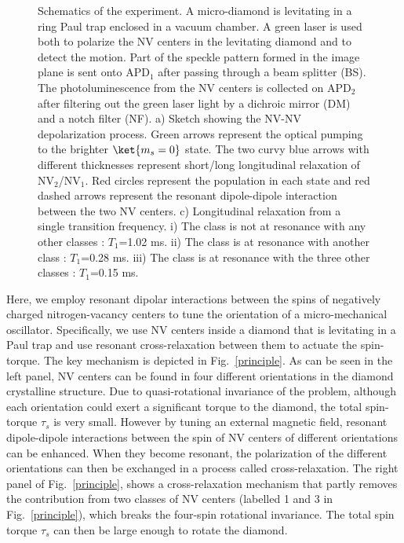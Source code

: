 \documentclass[preprintnumbers,amsmath,amssymb,superscriptaddress,twocolumn,showpacs]{revtex4-1}
\begin{document}
\begin{figure}[!ht]
  \centering {}
  \caption{Schematics of the experiment. A micro-diamond is levitating in a ring Paul trap enclosed in a vacuum chamber. A green laser is used both to polarize the NV centers in the levitating diamond and to detect the motion. Part of the speckle pattern formed in the image plane is sent onto APD$_1$ after passing through a beam splitter (BS). The photoluminescence from the NV centers is collected on APD$_2$ after filtering out the green laser light by a dichroic mirror (DM) and a notch filter (NF). a) Sketch showing the NV-NV depolarization process. Green arrows represent the optical pumping to the brighter $\ket{m_s=0}$ state. The two curvy blue arrows with different thicknesses represent short/long longitudinal relaxation of NV$_2$/NV$_1$. Red circles represent the population in each state and red dashed arrows represent the resonant dipole-dipole interaction between the two NV centers. c) Longitudinal relaxation from a single transition frequency. i) The class is not at resonance with any other classes : $T_1$=1.02 ms. ii) The class is at resonance with another class : $T_1$=0.28 ms. iii) The class is at resonance with the three other classes : $T_1$=0.15 ms.
  }\label{setup}
\end{figure}

Here, we employ resonant dipolar interactions between the spins of negatively charged nitrogen-vacancy centers to tune the orientation of a micro-mechanical oscillator. 
Specifically, we use NV centers inside a diamond that is levitating in a Paul trap and use resonant cross-relaxation between them to actuate
the spin-torque.
The key mechanism is depicted in Fig.~\ref{principle}. 
As can be seen in the left panel, NV centers can be found in four different orientations in the diamond crystalline structure. Due to quasi-rotational invariance of the problem, although each orientation could exert a significant torque to the diamond, the total spin-torque $\tau_s$ is very small.
However by tuning an external magnetic field, resonant dipole-dipole interactions between the spin of NV centers of different orientations can be enhanced. 
When they become resonant, the polarization of the different orientations can then be exchanged in a process called cross-relaxation.
The right panel of Fig.~\ref{principle}, shows a cross-relaxation mechanism that partly removes the contribution from two classes of NV centers (labelled 1 and 3 in Fig.~\ref{principle}), which breaks the four-spin rotational invariance. The total spin torque $\tau_s$ can then be large enough to rotate the diamond.
\end{document}
